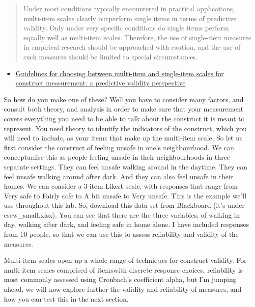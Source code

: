 \documentclass[]{book}
\providecommand{\tightlist}{%
  \setlength{\itemsep}{0pt}\setlength{\parskip}{0pt}}
\theoremstyle{definition}
\theoremstyle{definition}
\theoremstyle{definition}
\theoremstyle{remark}
\begin{document}
\begin{quote}
Under most conditions typically encountered in practical applications,
multi-item scales clearly outperform single items in terms of predictive
validity. Only under very specific conditions do single items perform
equally well as multi-item scales. Therefore, the use of single-item
measures in empirical research should be approached with caution, and
the use of such measures should be limited to special circumstances.
\end{quote}

\begin{itemize}
\tightlist
\item
  \href{https://link.springer.com/article/10.1007/s11747-011-0300-3}{Guidelines
  for choosing between multi-item and single-item scales for construct
  measurement: a predictive validity perspective}
\end{itemize}

So how do you make one of these? Well you have to consider many factors,
and consult both theory, and analysis in order to make sure that your
measurement covers everything you need to be able to talk about the
construct it is meant to represent. You need theory to identify the
indicators of the construct, which you will need to include, as your
items that make up the multi-item scale. So let us first consider the
construct of feeling unsafe in one's neighbourhood. We can conceptualise
this as people feeling unsafe in their neighbourhoods in three separate
settings. They can feel unsafe walking around in the daytime. They can
feel unsafe walking around after dark. And they can also feel unsafe in
their homes. We can consider a 3-item Likert scale, with responses that
range from Very safe to Fairly safe to A bit unsafe to Very unsafe. This
is the example we'll use throughout this lab. So, download this data set
from Blackboard (it's under csew\_small.xlsx). You can see that there
are the three variables, of walking in day, walking after dark, and
feeling safe in home alone. I have included responses from 10 people, so
that we can use this to assess reliability and validity of the measures.

Multi-item scales open up a whole range of techniques for construct
validity. For multi-item scales comprised of itemswith discrete response
choices, reliability is most commonly assessed using Cronbach's
coefficient alpha, but I'm jumping ahead, we will now explore further
the validity and reliability of measures, and how you can test this in
the next section.
\end{document}
